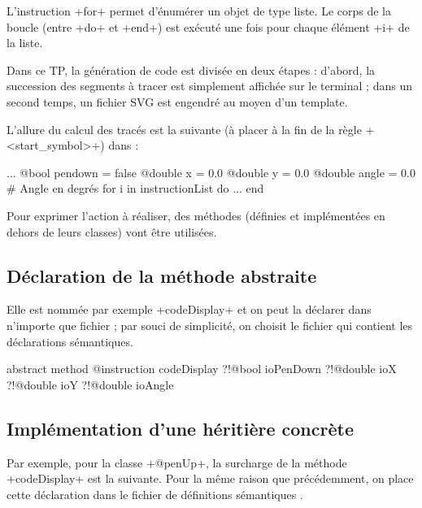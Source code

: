 L'instruction \ggs+for+ permet d’énumérer un objet de type liste. Le corps de la boucle (entre \ggs+do+ et \ggs+end+) est exécuté une fois pour chaque élément \ggs+i+ de la liste.









Dans ce TP, la génération de code est divisée en deux étapes : d'abord, la succession des segments à tracer est simplement affichée sur le terminal ; dans un second temps, un fichier SVG est engendré au moyen d'un template.

L'allure du calcul des tracés est la suivante (à placer à la fin de la règle \ggs+<start_symbol>+) dans  :

\begin{galgas}
  ...
  @bool pendown = false
  @double x = 0.0
  @double y = 0.0
  @double angle = 0.0 # Angle en degrés
  for i in instructionList do
    ...
  end
\end{galgas}

Pour exprimer l'action à réaliser, des méthodes (définies et implémentées en dehors de leurs classes) vont être utilisées.

\subsection{Déclaration de la méthode abstraite}
Elle est nommée par exemple \ggs+codeDisplay+ et on peut la déclarer dans n'importe que fichier ; par souci de simplicité, on choisit le fichier  qui contient les déclarations sémantiques.

\begin{galgas}
abstract method @instruction codeDisplay
  ?!@bool ioPenDown
  ?!@double ioX
  ?!@double ioY
  ?!@double ioAngle
\end{galgas}

\subsection{Implémentation d'une héritière concrète}

Par exemple, pour la classe \ggs+@penUp+, la surcharge de la méthode \ggs+codeDisplay+ est la suivante. Pour la même raison que précédemment, on place cette déclaration dans le fichier de définitions sémantiques .

